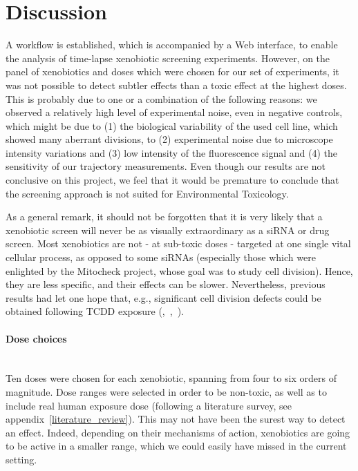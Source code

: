 \section{Discussion}

A workflow is established, which is accompanied by a Web interface, to
enable the analysis of time-lapse xenobiotic screening
experiments. However, on the panel of xenobiotics and doses which were
chosen for our set of experiments, it was not possible to detect
subtler effects than a toxic effect at the highest doses.
This is
probably due to one or a combination of the following reasons: we observed a
relatively high level of experimental noise, even in negative
controls, which might be due to (1) the biological variability of the used
cell line, which showed many aberrant divisions, to (2) experimental noise due to microscope intensity
variations and (3) low intensity of the fluorescence signal and (4) the sensitivity of our
trajectory measurements. Even though our results are not conclusive on
this project, we feel that it would be premature to conclude that the screening approach
is not suited for Environmental Toxicology. 

As a general remark, it should not be forgotten that it is very likely that a xenobiotic screen will never be as visually extraordinary as a siRNA or drug screen. Most xenobiotics are not - at sub-toxic doses - targeted at one single vital cellular process, as opposed to some siRNAs (especially those which were enlighted by the Mitocheck project, whose goal was to study cell division). Hence, they are less specific, and their effects can be slower. Nevertheless, previous results had let one hope that, e.g., significant cell division defects could be obtained following TCDD exposure (\cite{pmid20089886},~\cite{pmid18640100},~\cite{pmid11479202}).

\paragraph{Dose choices}~\\
Ten doses were chosen for each xenobiotic, spanning from four to six orders of magnitude. Dose ranges were selected in order to be non-toxic, as well as to include real human exposure dose (following a literature survey, see appendix~\ref{literature_review}). This may not have been the surest way to detect an effect. Indeed, depending on their mechanisms of action, xenobiotics are going to be active in a smaller range, which we could easily have missed in the current setting.

